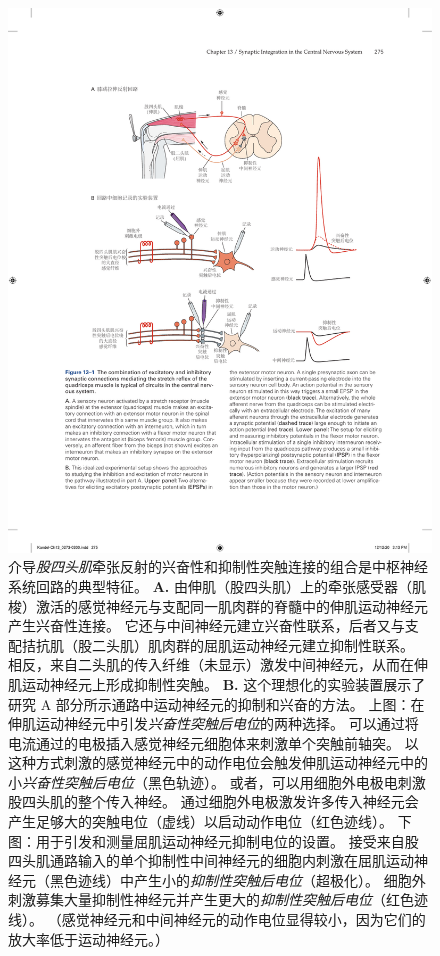 \begin{figure}[htbp]
	\centering
	\includegraphics[width=0.85\linewidth]{chap13/fig_13_1}
	\caption{介导\textit{股四头肌}牵张反射的兴奋性和抑制性突触连接的组合是中枢神经系统回路的典型特征。
		\textbf{A.} 由伸肌（股四头肌）上的牵张感受器（肌梭）激活的感觉神经元与支配同一肌肉群的脊髓中的伸肌运动神经元产生兴奋性连接。
		它还与中间神经元建立兴奋性联系，后者又与支配拮抗肌（股二头肌）肌肉群的屈肌运动神经元建立抑制性联系。
		相反，来自二头肌的传入纤维（未显示）激发中间神经元，从而在伸肌运动神经元上形成抑制性突触。
		\textbf{B.} 这个理想化的实验装置展示了研究 A 部分所示通路中运动神经元的抑制和兴奋的方法。
		上图：在伸肌运动神经元中引发\textit{兴奋性突触后电位}的两种选择。
		可以通过将电流通过的电极插入感觉神经元细胞体来刺激单个突触前轴突。
		以这种方式刺激的感觉神经元中的动作电位会触发伸肌运动神经元中的小\textit{兴奋性突触后电位}（黑色轨迹）。
		或者，可以用细胞外电极电刺激股四头肌的整个传入神经。
		通过细胞外电极激发许多传入神经元会产生足够大的突触电位（虚线）以启动动作电位（红色迹线）。
		下图：用于引发和测量屈肌运动神经元抑制电位的设置。
		接受来自股四头肌通路输入的单个抑制性中间神经元的细胞内刺激在屈肌运动神经元（黑色迹线）中产生小的\textit{抑制性突触后电位}（超极化）。
		细胞外刺激募集大量抑制性神经元并产生更大的\textit{抑制性突触后电位}（红色迹线）。
		（感觉神经元和中间神经元的动作电位显得较小，因为它们的放大率低于运动神经元。）}
	\label{fig:13_1}
\end{figure}


